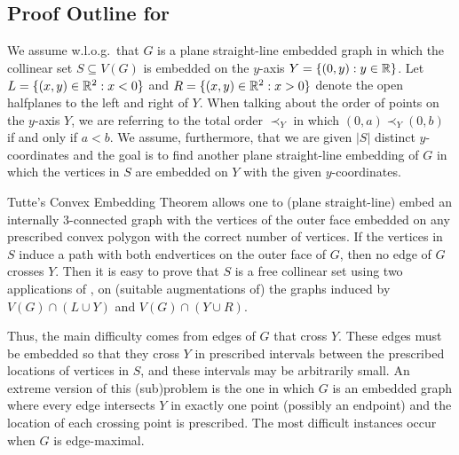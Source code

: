 
\subsection{Proof Outline for }

We assume w.l.o.g.\ that $G$ is a plane straight-line
embedded graph in which the collinear set $S\subseteq V(G)$ is embedded
on the $y$-axis $Y=\{(0,y):y\in\mathbb{R}\}$. Let
$L=\{(x,y)\in\mathbb{R}^2:x<0\}$ and $R=\{(x,y)\in\mathbb{R}^2: x >0\}$ denote the open
halfplanes to the left and right of $Y$. When talking about the order of points on the $y$-axis $Y$, we are referring to the total order $\prec_Y$ in which $(0,a) \prec_Y (0,b)$ if and only if $a<b$. We assume, furthermore, that we are given $|S|$ distinct $y$-coordinates and the goal is to find another plane straight-line embedding of $G$ in which the vertices in $S$ are embedded on $Y$ with the given $y$-coordinates.

Tutte's Convex Embedding Theorem \cite{tutte:how} allows one to (plane
straight-line) embed an internally 3-connected graph with the vertices
of the outer face embedded on any prescribed convex polygon with the
correct number of vertices.  If the vertices in $S$ induce a path with
both endvertices on the outer face of $G$, then no edge of $G$ crosses
$Y$. Then it is easy to prove that $S$ is a free
collinear set using two applications of \cite{tutte:how}, on (suitable augmentations of) the graphs induced
by $V(G)\cap(L\cup Y)$ and $V(G)\cap(Y\cup R)$.

Thus, the main difficulty comes from edges of $G$ that cross $Y$.
These edges must be embedded so that they cross $Y$ in prescribed
intervals between the prescribed locations of vertices in $S$, and
these intervals may be arbitrarily small.  An extreme version of this
(sub)problem is the one in which $G$ is an embedded graph where every
edge intersects $Y$ in exactly one point (possibly an endpoint) and
the location of each crossing point is prescribed.  The most difficult
instances occur when $G$ is edge-maximal.

